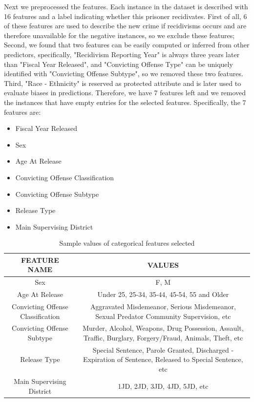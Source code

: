 \documentclass[sigconf]{acmart}
\begin{document}
Next we preprocessed the features. Each instance in the dataset is described with 16 features and a label indicating whether this prisoner recidivates. First of all, 6 of these features are used to describe the new crime if recidivisms occurs and are therefore unavailable for the negative instances, so we exclude these features; Second, 	we found that two features can be easily computed or inferred from other predictors, specifically, "Recidivism Reporting Year" is always three years later than "Fiscal Year Released", and "Convicting Offense Type" can be uniquely identified with "Convicting Offense Subtype", so we removed these two features. Third, "Race - Ethnicity" is reserved as protected attribute and is later used to evaluate biases in predictions. Therefore, we have 7 features left and we removed the instances that have empty entries for the selected features. Specifically, the 7 features are:
\begin{itemize}
\item Fiscal Year Released
\item Sex
\item Age At Release
\item Convicting Offense Classification
\item Convicting Offense Subtype
\item Release Type
\item Main Supervising District
\end{itemize}

\begin{table}
\begin{center}
\begin{tabular}{ c | c }
 \hline
 \textbf{FEATURE NAME} & \textbf{VALUES} \\
 \hline
 Sex & F, M \\
  \hline
 Age At Release & Under 25, 25-34, 35-44, 45-54, 55 and Older \\  
  \hline
 Convicting Offense Classification & Aggravated Misdemeanor, Serious Misdemeanor, Sexual Predator Community Supervision, etc \\
  \hline
Convicting Offense Subtype & Murder, Alcohol, Weapons, Drug Possession, Assault, Traffic, Burglary, Forgery/Fraud, Animals, Theft, etc\\  
 \hline
Release Type & Special Sentence, Parole Granted, Discharged - Expiration of Sentence, Released to Special Sentence, etc \\  
 \hline
Main Supervising District & 1JD, 2JD, 3JD, 4JD, 5JD, etc\\  
 \hline
\end{tabular}
\end{center}
\caption{Sample values of categorical features selected}
\label{table:1}
\end{table}
\end{document}
